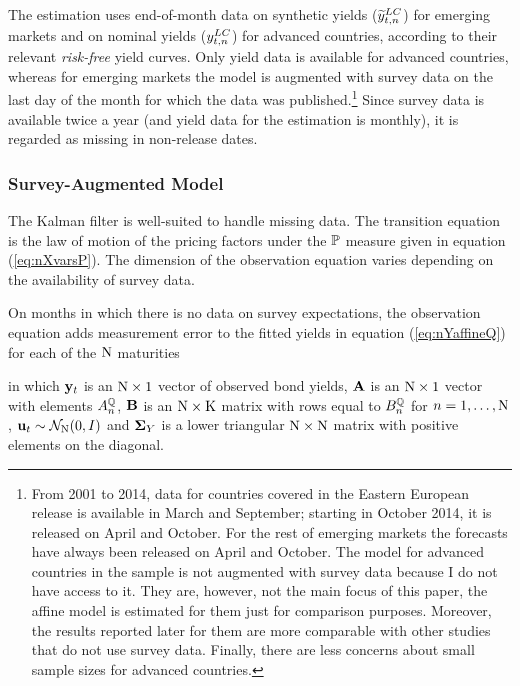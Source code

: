 {The %
estimation uses end-of-month data on synthetic yields (\(\widetilde{y}_{t,n} ^{LC}\)) for emerging markets and on nominal yields (\(y_{t,n} ^{LC}\)) for advanced countries, according to their relevant \textit{risk-free} yield curves. 
Only yield data is available for advanced countries, whereas for emerging markets the model is augmented with survey data on the last day of the month for which the data was published.\footnote{ From 2001 to 2014, data for countries covered in the Eastern European release is available in March and September; starting in October 2014, it is released on April and October. For the rest of emerging markets the forecasts have always been released on April and October. The model for advanced countries in the sample is not augmented with survey data because I do not have access to it. They are, however, not the main focus of this paper, the affine model is estimated for them just for comparison purposes. Moreover, the results reported later for them are more comparable with other studies that do not use survey data. Finally, there are less concerns about small sample sizes for advanced countries.} %
Since survey data is available twice a year (and yield data for the estimation is monthly), it is regarded as missing in non-release dates.

\subsubsection{Survey-Augmented Model}
The Kalman filter is well-suited to handle missing data. 
The transition equation is the law of motion of the pricing factors under the \(\mathbb{P}\) measure given in equation (\ref{eq:nXvarsP}).
The dimension of the observation equation varies depending on the availability of survey data. 

On months in which there is no data on survey expectations, the observation equation adds measurement error to the fitted yields in equation (\ref{eq:nYaffineQ}) for each of the \(\mathrm{N}\) maturities
	
\noindent in which \(\mathbf{y}_{t}\) is an \(\mathrm{N} \times 1\) vector of observed bond yields, \(\mathbf{A}\) is an \(\mathrm{N} \times 1\) vector with elements \(A_{n}^{\mathbb{Q}}\), \(\mathbf{B}\) is an \(\mathrm{N} \times \mathrm{K}\) matrix with rows equal to \(B_{n}^{\mathbb{Q}}\) for \(n = 1, \ldots, \mathrm{N}\), \(\mathbf{u}_{t} \sim \mathcal{N}_{\mathrm{N}} (0,I) \) and \(\mathbf{\mathbf{\Sigma}}_{Y}\) is a lower triangular \(\mathrm{N} \times \mathrm{N}\) matrix with positive elements on the diagonal.

}
